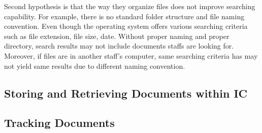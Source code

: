 Second hypothesis is that the way they organize files does not improve searching capability.
For example, there is no standard folder structure and file naming convention.
Even though the operating system offers various searching criteria such as file extension, file size, date.
Without proper naming and proper directory, search results may not include documents staffs are looking for.
Moreover, if files are in another staff's computer, same searching criteria has may not yield same results due to different naming convention.

\subsection{Storing and Retrieving Documents within IC}


\subsection{Tracking Documents}

